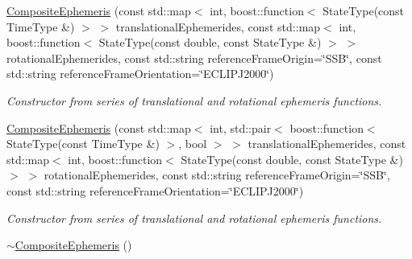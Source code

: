\begin{DoxyCompactItemize}
\item 
\hyperlink{classtudat_1_1ephemerides_1_1CompositeEphemeris_a0b901ed2bdfbb6deaf382cffb162bcfb}{Composite\+Ephemeris} (const std\+::map$<$ int, boost\+::function$<$ State\+Type(const Time\+Type \&) $>$ $>$ translational\+Ephemerides, const std\+::map$<$ int, boost\+::function$<$ State\+Type(const double, const State\+Type \&) $>$ $>$ rotational\+Ephemerides, const std\+::string reference\+Frame\+Origin=\char`\"{}S\+SB\char`\"{}, const std\+::string reference\+Frame\+Orientation=\char`\"{}E\+C\+L\+I\+P\+J2000\char`\"{})
\begin{DoxyCompactList}\small\item\em Constructor from series of translational and rotational ephemeris functions. \end{DoxyCompactList}\item 
\hyperlink{classtudat_1_1ephemerides_1_1CompositeEphemeris_abac65e1f6945ae888a48ea524b04f4be}{Composite\+Ephemeris} (const std\+::map$<$ int, std\+::pair$<$ boost\+::function$<$ State\+Type(const Time\+Type \&) $>$, bool $>$ $>$ translational\+Ephemerides, const std\+::map$<$ int, boost\+::function$<$ State\+Type(const double, const State\+Type \&) $>$ $>$ rotational\+Ephemerides, const std\+::string reference\+Frame\+Origin=\char`\"{}S\+SB\char`\"{}, const std\+::string reference\+Frame\+Orientation=\char`\"{}E\+C\+L\+I\+P\+J2000\char`\"{})
\begin{DoxyCompactList}\small\item\em Constructor from series of translational and rotational ephemeris functions. \end{DoxyCompactList}\item 
\hyperlink{classtudat_1_1ephemerides_1_1CompositeEphemeris_affde60b26b1fb26732475e50309bc541}{$\sim$\+Composite\+Ephemeris} ()\hypertarget{classtudat_1_1ephemerides_1_1CompositeEphemeris_affde60b26b1fb26732475e50309bc541}{}\label{classtudat_1_1ephemerides_1_1CompositeEphemeris_affde60b26b1fb26732475e50309bc541}


\end{DoxyCompactItemize}
